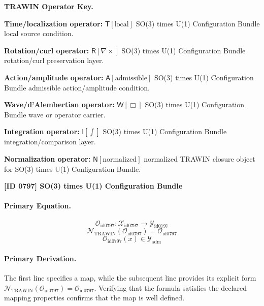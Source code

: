 \par\vspace{0.45\baselineskip}
\noindent\begin{minipage}[t]{\linewidth}
\begingroup
\small
\raggedright
\textbf{TRAWIN Operator Key.}\par
\noindent\textbf{Time/localization operator:} $\mathsf{T}\!\left[\mathrm{local}\right]$ SO(3) times U(1) Configuration Bundle local source condition.\par
\noindent\textbf{Rotation/curl operator:} $\mathsf{R}\!\left[\nabla\times\right]$ SO(3) times U(1) Configuration Bundle rotation/curl preservation layer.\par
\noindent\textbf{Action/amplitude operator:} $\mathsf{A}\!\left[\mathrm{admissible}\right]$ SO(3) times U(1) Configuration Bundle admissible action/amplitude condition.\par
\noindent\textbf{Wave/d'Alembertian operator:} $\mathsf{W}\!\left[\Box\right]$ SO(3) times U(1) Configuration Bundle wave or operator carrier.\par
\noindent\textbf{Integration operator:} $\mathsf{I}\!\left[\int\right]$ SO(3) times U(1) Configuration Bundle integration/comparison layer.\par
\noindent\textbf{Normalization operator:} $\mathsf{N}\!\left[\mathrm{normalized}\right]$ normalized TRAWIN closure object for SO(3) times U(1) Configuration Bundle.\par
\endgroup
\end{minipage}

\clearpage
\noindent\textbf{[ID 0797] SO(3) times U(1) Configuration Bundle}\par
\vspace{0.35em}
\paragraph{Primary Equation.}
\[
\mathcal{O}_{\mathrm{id0797}}:\mathcal{X}_{\mathrm{id0797}}\longrightarrow\mathcal{Y}_{\mathrm{id0797}}
\]
\[
\mathcal{N}_{\mathrm{TRAWIN}}(\mathcal{O}_{\mathrm{id0797}})=\mathcal{O}_{\mathrm{id0797}}
\]
\[
\mathcal{O}_{\mathrm{id0797}}(x)\in\mathcal{Y}_{\mathrm{adm}}
\]

\paragraph{Primary Derivation.}
The first line specifies a map, while the subsequent line provides its explicit form \( \mathcal{N}_{\mathrm{TRAWIN}}(\mathcal{O}_{\mathrm{id0797}})=\mathcal{O}_{\mathrm{id0797}} \). Verifying that the formula satisfies the declared mapping properties confirms that the map is well defined.
